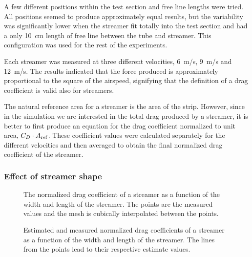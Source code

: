 A few different positions within the test section and free line
lengths were tried.  All positions seemed to produce approximately
equal results, but the variability was significantly lower when the
streamer fit totally into the test section and had a only 10~cm length
of free line between the tube and streamer.  This configuration was
used for the rest of the experiments.

Each streamer was measured at three different velocities, 6~m/s, 9~m/s
and 12~m/s.  The results indicated that the force produced is
approximately proportional to the square of the airspeed, signifying
that the definition of a drag coefficient is valid also for streamers.

The natural reference area for a streamer is the area of the strip.
However, since in the simulation we are interested in the total drag
produced by a streamer, it is better to first produce an equation for
the drag coefficient normalized to unit area, $C_D \cdot A_{\rm ref}$.
These coefficient values were calculated separately for the different
velocities and then averaged to obtain the final normalized drag
coefficient of the streamer.


\subsubsection*{Effect of streamer shape}

\begin{figure}[p]
\centering
\hspace*{-7mm}
\caption{The normalized drag coefficient of a streamer as a function
  of the width and length of the streamer.  The points are the
  measured values and the mesh is cubically interpolated between the
  points.}
\label{fig-streamer-CD-vs-shape}
\end{figure}


\begin{figure}[p]
\centering
\hspace*{-7mm}
\caption{Estimated and measured normalized drag coefficients of a
  streamer as a function of the width and length of the streamer.  The
  lines from the points lead to their respective estimate values.}
\label{fig-streamer-shape-estimate}
\end{figure}



